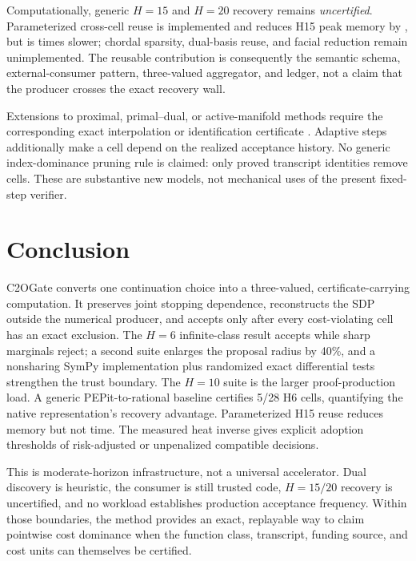 \documentclass[smallextended]{svjour3}
\begin{document}
Computationally, generic $H=15$ and $H=20$ recovery remains
\emph{uncertified}.  Parameterized cross-cell reuse is implemented and reduces
H15 peak memory by \BatchedHfifteenMemoryReduction{}, but is
\BatchedHfifteenWallRatio{} times slower; chordal sparsity, dual-basis reuse,
and facial reduction remain unimplemented.  The reusable contribution is
consequently the semantic schema, external-consumer pattern, three-valued
aggregator, and ledger, not a claim that the producer crosses the exact
recovery wall.

Extensions to proximal, primal--dual, or active-manifold methods require the
corresponding exact interpolation or identification certificate
\citep{Bousselmi2024}.  Adaptive steps additionally make a cell depend on the
realized acceptance history.  No generic index-dominance pruning rule is
claimed: only proved transcript identities remove cells.  These are substantive
new models, not mechanical uses of the present fixed-step verifier.

\section{Conclusion}

C2OGate converts one continuation choice into a three-valued,
certificate-carrying computation.  It preserves joint stopping dependence,
reconstructs the SDP outside the numerical producer, and accepts only after
every cost-violating cell has an exact exclusion.  The $H=6$ infinite-class
result accepts while sharp marginals reject; a second suite enlarges the
proposal radius by 40\%, and a nonsharing SymPy implementation plus randomized
exact differential tests strengthen the trust boundary.  The $H=10$ suite is
the larger proof-production load.  A generic PEPit-to-rational baseline
certifies 5/28 H6 cells, quantifying the native representation's recovery
advantage.  Parameterized H15 reuse reduces memory but not time.  The measured
heat inverse gives explicit adoption thresholds of
\HeatAmortizationEpisodes{} risk-adjusted or
\HeatUnpenalizedAmortizationEpisodes{} unpenalized compatible decisions.

This is moderate-horizon infrastructure, not a universal accelerator.  Dual
discovery is heuristic, the consumer is still trusted code, $H=15/20$ recovery
is uncertified, and no workload establishes production acceptance frequency.
Within those boundaries, the method provides an exact, replayable way to claim
pointwise cost dominance when the function class, transcript, funding source,
and cost units can themselves be certified.
\end{document}
